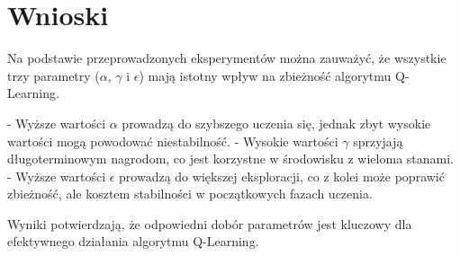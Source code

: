 \documentclass{article}
\begin{document}
\section{Wnioski}
Na podstawie przeprowadzonych eksperymentów można zauważyć, że wszystkie trzy parametry ($\alpha$, $\gamma$ i $\epsilon$) mają istotny wpływ na zbieżność algorytmu Q-Learning. 

- Wyższe wartości $\alpha$ prowadzą do szybszego uczenia się, jednak zbyt wysokie wartości mogą powodować niestabilność.
- Wysokie wartości $\gamma$ sprzyjają długoterminowym nagrodom, co jest korzystne w środowisku z wieloma stanami.
- Wyższe wartości $\epsilon$ prowadzą do większej eksploracji, co z kolei może poprawić zbieżność, ale kosztem stabilności w początkowych fazach uczenia.

Wyniki potwierdzają, że odpowiedni dobór parametrów jest kluczowy dla efektywnego działania algorytmu Q-Learning.
\end{document}
